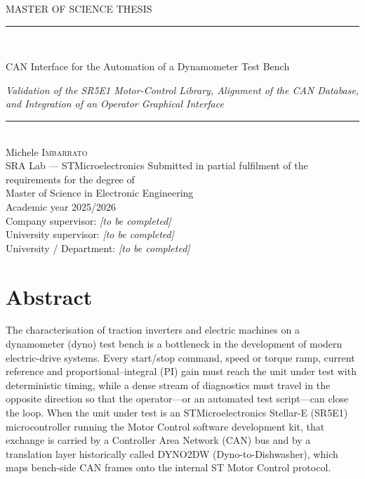 \documentclass[11pt,a4paper,oneside,openany]{book}
\theoremstyle{definition}
\begin{document}
\pagestyle{empty}
\begin{titlepage}
\centering
\vspace*{8mm}

{\sffamily\small\color{NavyInk} MASTER OF SCIENCE THESIS}\\[10mm]
{\color{NavyInk}\rule{\textwidth}{1.1pt}}\\[8mm]
{\Huge\bfseries\color{NavyInk}\raggedright
 CAN Interface for the Automation of a Dynamometer Test Bench\par}
\vspace{6mm}
{\Large\itshape
 Validation of the SR5E1 Motor-Control Library, Alignment of the CAN Database,
 and Integration of an Operator Graphical Interface\par}
\vspace{8mm}
{\color{NavyInk}\rule{\textwidth}{0.4pt}}\\[12mm]

{\large
 Michele \textsc{Imbarrato}\\[2mm]
 {\sffamily\small SRA Lab --- STMicroelectronics}}
\vfill
{\sffamily\small
 Submitted in partial fulfilment of the requirements for the degree of\\
 Master of Science in Electronic Engineering}\\[8mm]
{\small
 Academic year 2025/2026}\\[10mm]
{\sffamily\footnotesize
 Company supervisor: \textit{[to be completed]}\\
 University supervisor: \textit{[to be completed]}\\
 University / Department: \textit{[to be completed]}}
\end{titlepage}

\frontmatter
\pagestyle{plain}
\tableofcontents
\clearpage
\listoffigures
\clearpage
\listoftables
\clearpage
\lstlistoflistings
\clearpage

\chapter*{Abstract}
The characterisation of traction inverters and electric machines on a
dynamometer (dyno) test bench is a bottleneck in the development of modern
electric-drive systems. Every start/stop command, speed or torque ramp,
current reference and proportional--integral (PI) gain must reach the unit
under test with deterministic timing, while a dense stream of diagnostics
must travel in the opposite direction so that the operator---or an automated
test script---can close the loop. When the unit under test is an
STMicroelectronics Stellar-E (SR5E1) microcontroller running the Motor
Control software development kit, that exchange is carried by a Controller
Area Network (CAN) bus and by a translation layer historically called
DYNO2DW (Dyno-to-Dishwasher), which maps bench-side CAN frames onto the
internal ST Motor Control protocol.
\end{document}
